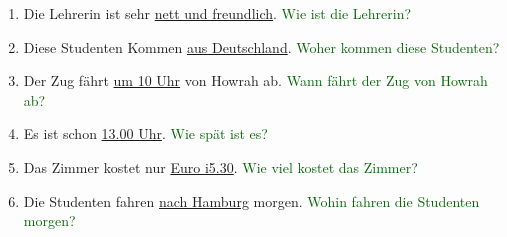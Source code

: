 \documentclass{article}
\begin{document}
\begin{enumerate}
\begin{enumerate}
        \item Die Lehrerin ist sehr \underline{nett und freundlich}. \textcolor{darkgreen}{Wie ist die Lehrerin?}
        \item Diese Studenten Kommen \underline{aus Deutschland}. \textcolor{darkgreen}{Woher kommen diese Studenten?}
        \item Der Zug fährt \underline{um 10 Uhr} von Howrah ab. \textcolor{darkgreen}{Wann fährt der Zug von Howrah ab?}
        \item Es ist schon \underline{13.00 Uhr}. \textcolor{darkgreen}{Wie spät ist es?}
        \item Das Zimmer kostet nur \underline{Euro i5.30}. \textcolor{darkgreen}{Wie viel kostet das Zimmer?}
        \item Die Studenten fahren \underline{nach Hamburg} morgen. \textcolor{darkgreen}{Wohin fahren die Studenten morgen?}
    \end{enumerate}
\end{enumerate}
\end{document}
